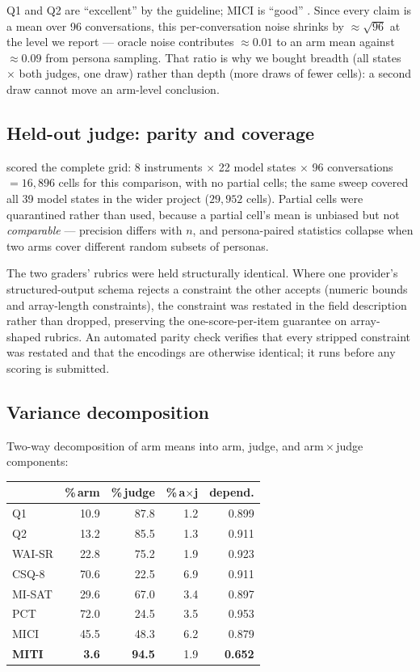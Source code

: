 Q1 and Q2 are ``excellent'' by the \citet{koo2016icc} guideline; MICI is ``good''
\citep{shrout1979icc}. Since every claim is a mean over 96 conversations, this
per-conversation noise shrinks by ${\approx}\sqrt{96}$ at the level we report --- oracle noise
contributes ${\approx}0.01$ to an arm mean against ${\approx}0.09$ from persona sampling. That
ratio is why we bought breadth (all states $\times$ both judges, one draw) rather than depth
(more draws of fewer cells): a second draw cannot move an arm-level conclusion.

\subsection{Held-out judge: parity and coverage}
\heldoutjudge{} scored the complete grid: 8 instruments $\times$ 22 model states $\times$ 96
conversations $=16{,}896$ cells for this comparison, with no partial cells; the same sweep
covered all 39 model states in the wider project ($29{,}952$ cells). Partial cells were quarantined rather
than used, because a partial cell's mean is unbiased but not \emph{comparable} --- precision
differs with $n$, and persona-paired statistics collapse when two arms cover different random
subsets of personas.

The two graders' rubrics were held structurally identical. Where one provider's structured-output
schema rejects a constraint the other accepts (numeric bounds and array-length constraints), the
constraint was restated in the field description rather than dropped, preserving the
one-score-per-item guarantee on array-shaped rubrics. An automated parity check verifies that
every stripped constraint was restated and that the encodings are otherwise identical; it runs
before any scoring is submitted.

\subsection{Variance decomposition}
Two-way decomposition of arm means into arm, judge, and arm\,$\times$\,judge components:

\begin{center}\small
\begin{tabular}{@{}lrrrr@{}}
\toprule
& \%\,arm & \%\,judge & \%\,a$\times$j & depend. \\
\midrule
Q1     & 10.9 & 87.8 & 1.2 & 0.899 \\
Q2     & 13.2 & 85.5 & 1.3 & 0.911 \\
WAI-SR & 22.8 & 75.2 & 1.9 & 0.923 \\
CSQ-8  & 70.6 & 22.5 & 6.9 & 0.911 \\
MI-SAT & 29.6 & 67.0 & 3.4 & 0.897 \\
PCT    & 72.0 & 24.5 & 3.5 & 0.953 \\
MICI   & 45.5 & 48.3 & 6.2 & 0.879 \\
\textbf{MITI} & \textbf{3.6} & \textbf{94.5} & 1.9 & \textbf{0.652} \\
\bottomrule
\end{tabular}
\end{center}

